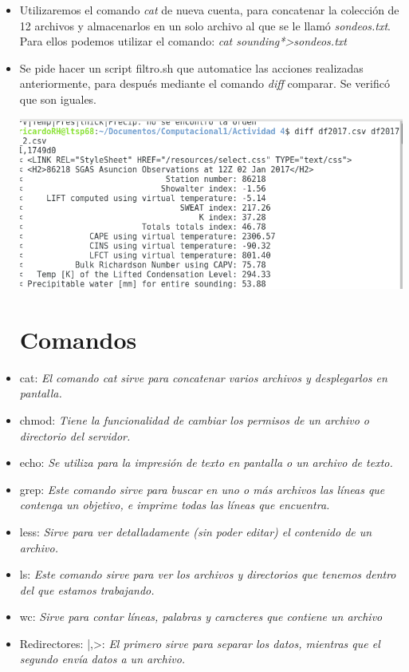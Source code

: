 \documentclass{article}
\begin{document}
\begin{doublespace}
\begin{itemize}
\item Utilizaremos el comando \textit{cat} de nueva cuenta, para concatenar la colección de 12 archivos y almacenarlos en un solo archivo al que se le llamó \textit{sondeos.txt}. Para ellos podemos utilizar el comando: \textit{cat sounding*>sondeos.txt} 
\item Se pide hacer un script filtro.sh que automatice las acciones realizadas anteriormente, para después mediante el comando \textit{diff} comparar. Se verificó que son iguales.
\\
\begin{center}
\includegraphics[scale=0.5]{act49.png}
\end{center}

\section{Comandos}
\item cat: \textit{El comando cat sirve para concatenar varios archivos y desplegarlos en pantalla.}
\item chmod: \textit{Tiene la funcionalidad de cambiar los permisos de un archivo o directorio del servidor.}
\item echo: \textit{Se utiliza para la impresión de texto en pantalla o un archivo de texto.}
\item grep: \textit{Este comando sirve para buscar en uno o más archivos las líneas que contenga un objetivo, e imprime todas las líneas que encuentra.}
\item less: \textit{Sirve para ver detalladamente (sin poder editar) el contenido de un archivo.}
\item ls: \textit{Este comando sirve para ver los archivos y directorios que tenemos dentro del que estamos trabajando.}
\item wc: \textit{Sirve para contar líneas, palabras y caracteres que contiene un archivo}
\item Redirectores: |,>: \textit{El primero sirve para separar los datos, mientras que el segundo envía datos a un archivo.}


\end{itemize}
\end{doublespace}
\end{document}
